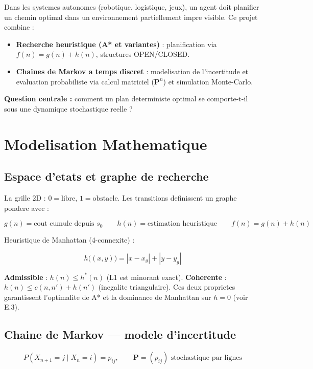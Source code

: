 \documentclass[11pt,a4paper]{article}
\begin{document}
Dans les systemes autonomes (robotique, logistique, jeux), un agent doit planifier un chemin optimal
dans un environnement partiellement impre visible. Ce projet combine :

\begin{itemize}[leftmargin=1.4cm,itemsep=2pt]
  \item \textbf{Recherche heuristique (A* et variantes)} : planification via $f(n)=g(n)+h(n)$, structures OPEN/CLOSED.
  \item \textbf{Chaines de Markov a temps discret} : modelisation de l'incertitude et evaluation probabiliste via calcul matriciel ($\mathbf{P}^n$) et simulation Monte-Carlo.
\end{itemize}

\textbf{Question centrale :} comment un plan deterministe optimal se comporte-t-il sous une dynamique stochastique reelle ?

\section{Modelisation Mathematique}

\subsection{Espace d'etats et graphe de recherche}

La grille 2D : $0=\text{libre}$, $1=\text{obstacle}$. Les transitions definissent un graphe pondere avec :
\begin{formulebox}
\[ g(n)=\text{cout cumule depuis }s_0 \qquad h(n)=\text{estimation heuristique} \qquad f(n)=g(n)+h(n) \]
\end{formulebox}
Heuristique de Manhattan (4-connexite) :
\begin{formulebox}
\[ h\bigl((x,y)\bigr)=|x-x_g|+|y-y_g| \]
\end{formulebox}
\textbf{Admissible} : $h(n)\leq h^*(n)$ (L1 est minorant exact).
\textbf{Coherente} : $h(n)\leq c(n,n')+h(n')$ (inegalite triangulaire).
Ces deux proprietes garantissent l'optimalite de A* et la dominance de Manhattan sur $h=0$ (voir E.3).

\subsection{Chaine de Markov --- modele d'incertitude}

\begin{formulebox}
\[ P(X_{n+1}=j\mid X_n=i)=p_{ij}, \qquad \mathbf{P}=(p_{ij})\text{ stochastique par lignes} \]
\end{formulebox}
\end{document}
